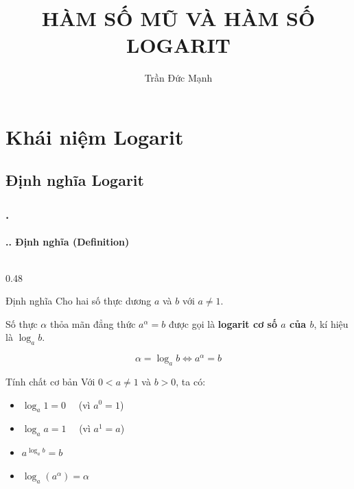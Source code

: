 \documentclass[11pt, aspectratio=169]{beamer}
\title[LOGARIT (LOGARITHM)]{HÀM SỐ MŨ VÀ HÀM SỐ LOGARIT}
\author[Trần Đức Mạnh]{
    Trần Đức Mạnh \\[0.2cm] 
}
\begin{document}
\begin{frame}
    \titlepage
\end{frame}

\section{Khái niệm Logarit}

\subsection{Định nghĩa Logarit}

\begin{frame}[fragile]
    \frametitle{\thesection. \insertsection}
    \framesubtitle{\thesection.\thesubsection. Định nghĩa (Definition)}

    \begin{columns}[T, onlytextwidth]
        \begin{column}{0.48\textwidth}
            \begin{block}{Định nghĩa}
                \footnotesize
                Cho hai số thực dương $a$ và $b$ với $a \neq 1$.
                
                Số thực $\alpha$ thỏa mãn đẳng thức $a^\alpha = b$ được gọi là \textbf{logarit cơ số $a$ của $b$}, kí hiệu là $\log_a b$.
                
                \[
                    \boxed{\alpha = \log_a b \iff a^\alpha = b}
                \]
            \end{block}
            
            \vspace{0.1cm}
            
            \begin{block}{Tính chất cơ bản}
                \footnotesize
                Với $0 < a \neq 1$ và $b > 0$, ta có:
                \begin{itemize}
                    \item $\log_a 1 = 0 \quad$ (vì $a^0 = 1$)
                    \item $\log_a a = 1 \quad$ (vì $a^1 = a$)
                    \item $a^{\log_a b} = b$
                    \item $\log_a (a^\alpha) = \alpha$
                \end{itemize}
            \end{block}
            

\end{column}
\end{columns}
\end{frame}
\end{document}
